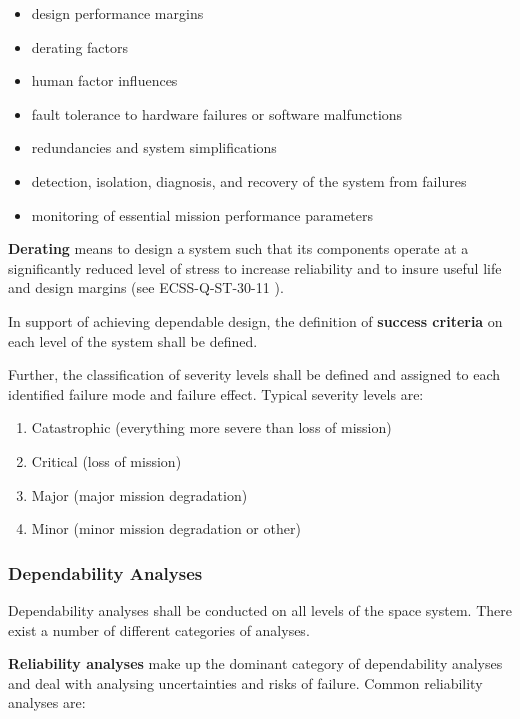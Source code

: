 \begin{itemize}
\item design performance margins
\item derating factors
\item human factor influences
\item fault tolerance to hardware failures or software malfunctions
\item redundancies and system simplifications
\item detection, isolation, diagnosis, and recovery of the system from failures
\item monitoring of essential mission performance parameters
\end{itemize}

\textbf{Derating} means to design a system such that its components operate at a significantly reduced level of stress to increase reliability and to insure useful life and design margins (see ECSS-Q-ST-30-11 \cite{ECSS-Q-ST-30-11}).

In support of achieving dependable design, the definition of \textbf{success criteria} on each level of the system shall be defined.

Further, the classification of severity levels shall be defined and assigned to each identified failure mode and failure effect. Typical severity levels are:

\begin{enumerate}
\item Catastrophic (everything more severe than loss of mission)
\item Critical (loss of mission)
\item Major (major mission degradation)
\item Minor (minor mission degradation or other)
\end{enumerate}

\subsubsection{Dependability Analyses}

Dependability analyses shall be conducted on all levels of the space system. There exist a number of different categories of analyses.

\textbf{Reliability analyses} make up the dominant category of dependability analyses and deal with analysing uncertainties and risks of failure. Common reliability analyses are:

